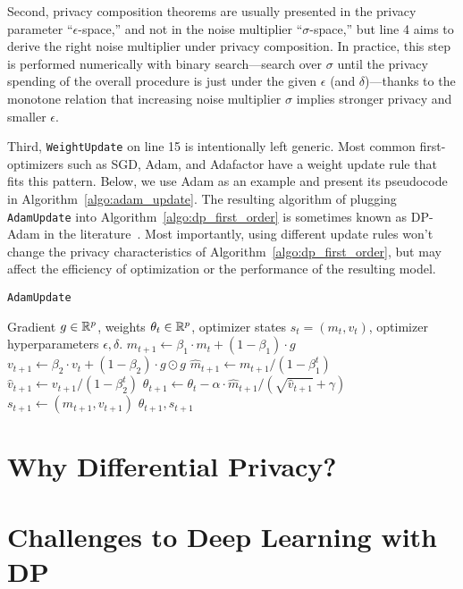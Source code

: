 Second, privacy composition theorems are usually presented in the privacy parameter ``$\epsilon$-space,'' and not in the noise multiplier ``$\sigma$-space,'' but line 4 aims to derive the right noise multiplier under privacy composition.
In practice, this step is performed numerically with binary search---search over $\sigma$ until the privacy spending of the overall procedure is just under the given $\epsilon$ (and $\delta$)---thanks to the monotone relation that increasing noise multiplier $\sigma$ implies stronger privacy and smaller $\epsilon$.

Third, \texttt{WeightUpdate} on line 15 is intentionally left generic. 
Most common first-optimizers such as SGD, Adam, and Adafactor have a weight update rule that fits this pattern. 
Below, we use Adam as an example and present its pseudocode in Algorithm~\ref{algo:adam_update}.
The resulting algorithm of plugging \texttt{AdamUpdate} into Algorithm~\ref{algo:dp_first_order} is sometimes known as DP-Adam in the literature~\cite{li2022large}.
Most importantly, using different update rules won't change the privacy characteristics of Algorithm~\ref{algo:dp_first_order}, but may affect the efficiency of optimization or the performance of the resulting model.

\begin{algorithm}[H]
\centering
\caption{ \texttt{AdamUpdate} }
\begin{algorithmic}[1]
  Gradient $g \in \mathbb{R}^p$, weights $\theta_t \in \mathbb{R}^p$, optimizer states $s_t = (m_t, v_t)$, optimizer hyperparameters $\epsilon, \delta$.
  \State
  $
  m_{t+1} \leftarrow
    \beta_{1} \cdot m_{t} + \left(1-\beta_{1}\right) \cdot g$
  \State
  $v_{t+1} \leftarrow
    \beta_{2} \cdot v_{t}+\left(1-\beta_{2}\right) \cdot g \odot g
  $
  \State
  $
  \widehat{m}_{t+1} \leftarrow m_{t+1} /\left(1-\beta_{1}^{t}\right)$
  \State
  $\widehat{v}_{t+1} \leftarrow v_{t+1} /\left(1-\beta_{2}^{t}\right)$
  \State
  $
  \theta_{t+1} \leftarrow \theta_{t}-\alpha \cdot \widehat{m}_{t+1} /\left(\sqrt{\widehat{v}_{t+1}}+\gamma\right)
  $
  \State $s_{t+1}\gets (m_{t +1}, v_{t + 1})$
  \State  \Return $\theta_{t+1}, s_{t+1}$
\end{algorithmic}
\label{algo:adam_update}
\end{algorithm}


\section{Why Differential Privacy?}

\section{Challenges to Deep Learning with DP}
